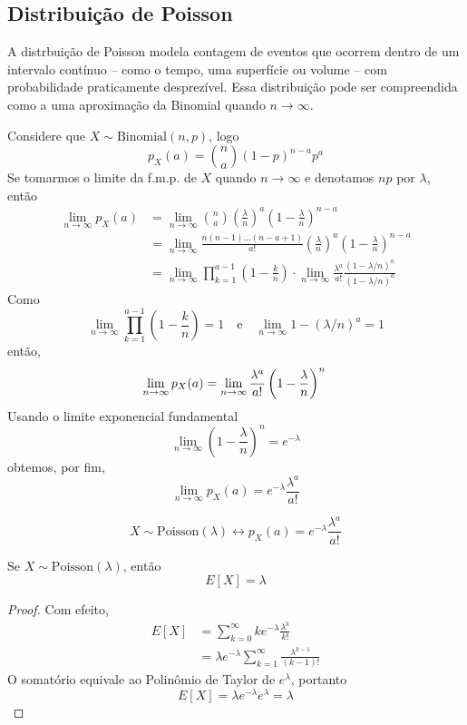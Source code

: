 \subsection{Distribuição de Poisson}

A distrbuição de Poisson modela contagem de eventos que ocorrem dentro de um intervalo
contínuo -- como o tempo, uma superfície ou volume -- com probabilidade praticamente
desprezível. Essa distribuição pode ser compreendida como a uma aproximação da Binomial
quando $n \to \infty$.

Considere que $X \sim \mathrm{Binomial}(n, p)$, logo
\[
	p_X(a) = \binom{n}{a} (1-p)^{n-a} p^a
\]
Se tomarmos o limite da f.m.p. de $X$ quando $n \to \infty$ e denotamos $np$ por $\lambda$,
então
\begin{align*}
	\lim_{n \to \infty} p_X(a) & = \lim_{n \to \infty} \binom{n}{a} \left(\frac{\lambda}{n}\right)^a \left(1 - \frac{\lambda}{n}\right)^{n-a}                  \\
	                           & = \lim_{n \to \infty} \frac{n(n-1)\ldots(n-a+1)}{a!}\left(\frac{\lambda}{n}\right)^a \left(1 - \frac{\lambda}{n}\right)^{n-a} \\
	                           & = \lim_{n \to \infty} \prod_{k=1}^{a-1} \left(1 - \frac{k}{n}\right) \cdot
	\lim_{n \to \infty} \frac{\lambda^a}{a!} \frac{(1 - \lambda / n)^n}{(1 - \lambda / n)^a}
\end{align*}
Como
\[
	\lim_{n \to \infty} \prod_{k=1}^{a-1} \left(1 - \frac{k}{n}\right) = 1 \quad
	\text{e} \quad \lim_{n \to \infty} 1 - (\lambda / n)^a = 1
\]
então,
\[
	\lim_{n \to \infty} p_X(a) = \lim_{n \to \infty} \frac{\lambda^a}{a!} \left(1 - \frac{\lambda}{n}\right)^n \\
\]
Usando o limite exponencial fundamental
\[
	\lim_{n \to \infty} \left(1 - \frac{\lambda}{n}\right)^n = e^{-\lambda}
\]
obtemos, por fim,
\[
	\lim_{n \to \infty} p_X(a) = e^{-\lambda} \frac{\lambda^a}{a!}
\]

\begin{def:poisson}
\[
	X \sim \mathrm{Poisson}(\lambda) \longleftrightarrow p_X(a) = e^{-\lambda} \frac{\lambda^a}{a!}
\]
\end{def:poisson}

\begin{prop:esperanca poisson}
Se $X \sim \mathrm{Poisson}(\lambda)$, então
\[
	E[X] = \lambda
\]
\begin{proof}
	Com efeito,
	\begin{align*}
		E[X] & = \sum_{k = 0}^\infty k e^{-\lambda} \frac{\lambda^k}{k!}             \\
		     & = \lambda e^{-\lambda} \sum_{k=1}^\infty \frac{\lambda^{k-1}}{(k-1)!}
	\end{align*}
	O somatório equivale ao Polinômio de Taylor de $e^\lambda$, portanto
	\[
		E[X] = \lambda e^{-\lambda} e^{\lambda} = \lambda
	\]
\end{proof}
\end{prop:esperanca poisson}
